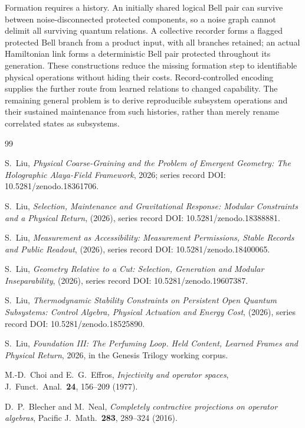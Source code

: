 \documentclass[12pt,a4paper]{article}
\begin{document}
Formation requires a history. An initially shared logical Bell
pair can survive between noise-disconnected protected components,
so a noise graph cannot delimit all surviving quantum relations.
A collective recorder forms a flagged protected Bell branch from
a product input, with all branches retained; an actual Hamiltonian
link forms a deterministic Bell pair protected throughout its
generation. These constructions reduce the missing formation step
to identifiable physical operations without hiding their costs.
Record-controlled encoding supplies the further route from learned
relations to changed capability. The remaining general problem is
to derive reproducible subsystem operations and their sustained
maintenance from such histories, rather than merely rename
correlated states as subsystems.

\begin{thebibliography}{99}

S.~Liu, \emph{Physical Coarse-Graining and the Problem of Emergent Geometry: The Holographic Alaya-Field Framework}, 2026; series record DOI: 10.5281/zenodo.18361706.

S.~Liu, \emph{Selection, Maintenance and Gravitational Response: Modular Constraints and a Physical Return}, (2026), series record DOI: 10.5281/zenodo.18388881.

S.~Liu, \emph{Measurement as Accessibility: Measurement Permissions, Stable Records and Public Readout}, (2026), series record DOI: 10.5281/zenodo.18400065.

S.~Liu, \emph{Geometry Relative to a Cut: Selection, Generation and Modular Inseparability}, (2026), series record DOI: 10.5281/zenodo.19607387.

S.~Liu, \emph{Thermodynamic Stability Constraints on Persistent Open Quantum Subsystems: Control Algebra, Physical Actuation and Energy Cost}, (2026), series record DOI: 10.5281/zenodo.18525890.

S.~Liu, \emph{Foundation III: The Perfuming Loop. Held Content, Learned Frames and Physical Return}, 2026, in the Genesis Trilogy working corpus.

M.-D.~Choi and E.~G.~Effros, \emph{Injectivity and operator spaces},
J.~Funct.~Anal.\ \textbf{24}, 156--209 (1977).

D.~P.~Blecher and M.~Neal, \emph{Completely contractive projections on operator algebras},
Pacific J.~Math.\ \textbf{283}, 289--324 (2016).


\end{thebibliography}
\end{document}
